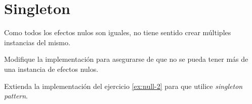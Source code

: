 \section{Singleton}
  \begin{Exercise}[
      title={Instancia única del efecto nulo}, 
      label={ex:singleton-1}, 
      difficulty=1
    ]
    Como todos los efectos nulos son iguales, no tiene sentido crear múltiples instancias 
    del mismo.

    Modifique la implementación para asegurarse de que no se pueda tener más de una 
    instancia de efectos nulos.
  \end{Exercise}

  \begin{Exercise}[
    title={Extender otros efectos}, 
    label={ex:singleton-2}, 
    difficulty=2
  ]
  Extienda la implementación del ejercicio \ref{ex:null-2} para que utilice
  \textit{singleton pattern}.
\end{Exercise}
%